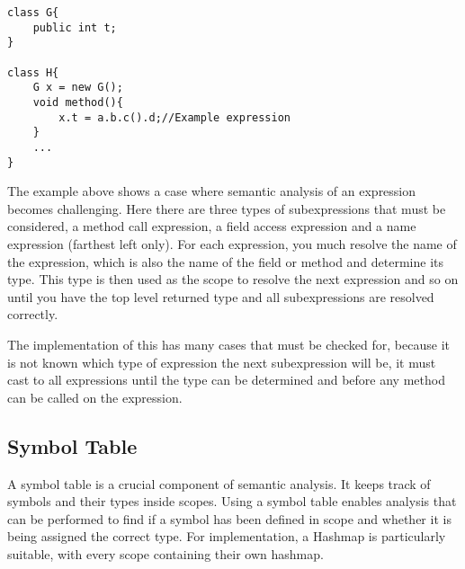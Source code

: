 \documentclass[twocolumn]{article} 	%
\begin{document}
\begin{lstlisting}
class G{
	public int t;
}

class H{
	G x = new G();
	void method(){ 
		x.t = a.b.c().d;//Example expression
	}
	...
}
\end{lstlisting}

The example above shows a case where semantic analysis of an expression becomes challenging. Here there are three types of subexpressions that must be considered, a method call expression, a field access expression and a name expression (farthest left only). For each expression, you much resolve the name of the expression, which is also the name of the field or method and determine its type. This type is then used as the scope to resolve the next expression and so on until you have the top level returned type and all subexpressions are resolved correctly. 

The implementation of this has many cases that must be checked for, because it is not known which type of expression the next subexpression will be, it must cast to all expressions until the type can be determined and before any method can be called on the expression.

\subsection{Symbol Table}
A symbol table is a crucial component of semantic analysis. It keeps track of symbols and their types inside scopes. Using a symbol table enables analysis that can be performed to find if a symbol has been defined in scope and whether it is being assigned the correct type. For implementation, a Hashmap is particularly suitable, with every scope containing their own hashmap.



\end{document}
